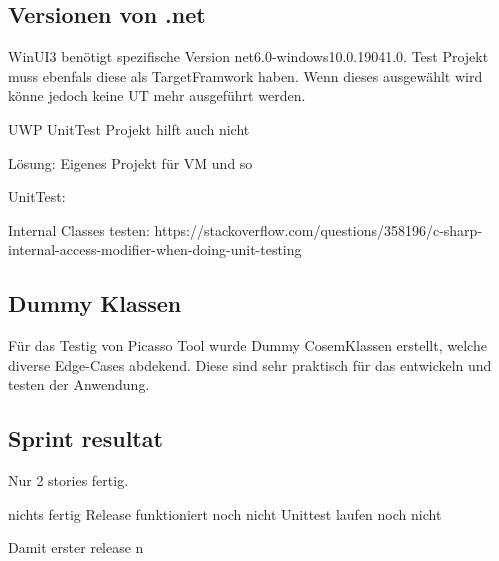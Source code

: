 \subsection{Versionen von .net}
WinUI3 benötigt spezifische Version net6.0-windows10.0.19041.0.
Test Projekt muss ebenfals diese als TargetFramwork haben.
Wenn dieses ausgewählt wird könne jedoch keine UT mehr ausgeführt werden.

UWP UnitTest Projekt hilft auch nicht

Lösung:
Eigenes Projekt für VM und so




UnitTest:

Internal Classes testen:
https://stackoverflow.com/questions/358196/c-sharp-internal-access-modifier-when-doing-unit-testing

\subsection{Dummy Klassen}
Für das Testig von Picasso Tool wurde Dummy CosemKlassen erstellt, welche diverse Edge-Cases abdekend.
Diese sind sehr praktisch für das entwickeln und testen der Anwendung.


\subsection{Sprint resultat}
Nur 2 stories fertig.


nichts fertig
Release funktioniert noch nicht
Unittest laufen noch nicht

Damit erster release n




